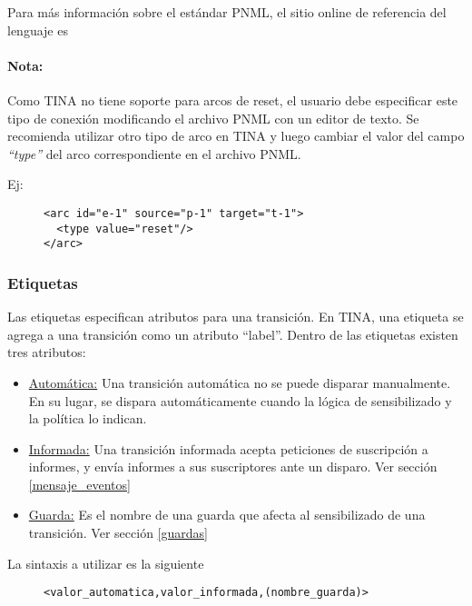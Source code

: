 Para más información sobre el estándar PNML, el sitio online de referencia del
lenguaje es \cite{PnmlSite}

\begin{framed}
\paragraph{Nota:}
Como TINA no tiene soporte para arcos de reset, el usuario debe especificar
este tipo de conexión modificando el archivo PNML con un editor de texto.
Se recomienda utilizar otro tipo de arco en TINA y luego cambiar el valor del
campo \textit{``type''} del arco correspondiente en el archivo PNML.

Ej:
\begin{figure}[H]
\centering
\begin{verbatim}
<arc id="e-1" source="p-1" target="t-1">
  <type value="reset"/>
</arc>
\end{verbatim}
\end{figure}
\end{framed}

\subsubsection{Etiquetas}

Las etiquetas especifican atributos para una transición. En TINA, una etiqueta
se agrega a una transición como un atributo ``label''.
Dentro de las etiquetas existen tres atributos:

\begin{itemize}
    \item \underline{Automática:} Una transición automática no se puede disparar
    manualmente. En su lugar, se dispara automáticamente cuando la lógica de
    sensibilizado y la política lo indican.
    \item \underline{Informada:} Una transición informada acepta peticiones de
    suscripción a informes, y envía informes a sus suscriptores ante un disparo.
    Ver sección \ref{mensaje_eventos}
    \item \underline{Guarda:} Es el nombre de una guarda que afecta
    al sensibilizado de una transición. Ver sección \ref{guardas}
\end{itemize}

La sintaxis a utilizar es la siguiente

\begin{figure}[H]
\centering
\begin{verbatim}
<valor_automatica,valor_informada,(nombre_guarda)>
\end{verbatim}
\end{figure}

